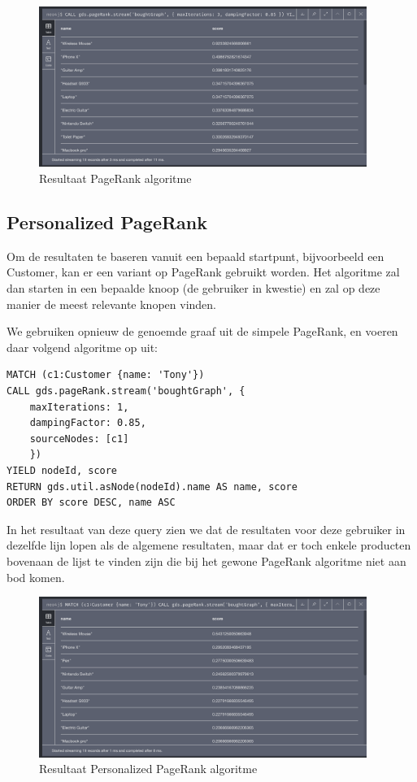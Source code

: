 \begin{figure} [ht]
	\centering
	\includegraphics[width=0.95\textwidth]{img/pageRank_res_1}
	\caption{Resultaat PageRank algoritme}
	\label{fig:simplePageRankResult}
\end{figure}


\subsection{Personalized PageRank}
\label{sec:Personalized PageRank}

Om de resultaten te baseren vanuit een bepaald startpunt, bijvoorbeeld een Customer, kan er een variant op PageRank gebruikt worden. Het algoritme zal dan starten in een bepaalde knoop (de gebruiker in kwestie) en zal op deze manier de meest relevante knopen vinden.

We gebruiken opnieuw de genoemde graaf uit de simpele PageRank, en voeren daar volgend algoritme op uit: 

\begin{lstlisting}[caption={Personalized PageRank algoritme }]
MATCH (c1:Customer {name: 'Tony'})
CALL gds.pageRank.stream('boughtGraph', {
	maxIterations: 1,
	dampingFactor: 0.85,
	sourceNodes: [c1]
	})
YIELD nodeId, score
RETURN gds.util.asNode(nodeId).name AS name, score
ORDER BY score DESC, name ASC
\end{lstlisting}

In het resultaat van deze query zien we dat de resultaten voor deze gebruiker in dezelfde lijn lopen als de algemene resultaten, maar dat er toch enkele producten bovenaan de lijst te vinden zijn die bij het gewone PageRank algoritme niet aan bod komen.

\begin{figure} [ht]
	\centering
	\includegraphics[width=0.95\textwidth]{img/persPageRank_res_1}
	\caption{Resultaat Personalized PageRank algoritme}
	\label{fig:personalizedPageRankResult}
\end{figure}

